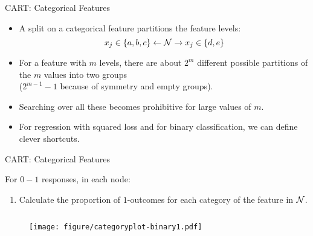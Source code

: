\documentclass[11pt,compress,t,notes=noshow, xcolor=table]{beamer}
\begin{document}
  \begin{vbframe}{CART: Categorical Features}
  \begin{itemize}
  \item A split on a categorical feature partitions the feature levels:
    $$x_j \in \{a,b,c\} \leftarrow \mathcal{N} \rightarrow x_j \in \{d,e\} $$
  \item For a feature with $m$ levels,
  there are about $2^m$ different possible partitions of the $m$ values into two groups\\ ($2^{m-1} - 1$ because of symmetry and empty groups).
  \item Searching over all these becomes prohibitive for large values of $m$.
  \item For regression with squared loss and for binary classification, we can define clever shortcuts.
  \end{itemize}

  \end{vbframe}
  
  \begin{frame}{CART: Categorical Features}

For $0-1$ responses, in each node:
  \begin{enumerate}
  \item Calculate the proportion of $1$-outcomes for each category of the feature in $\mathcal{N}$.

  \end{enumerate}
  \begin{columns}
  \begin{column}{0.33\textwidth}
  \begin{figure}
  \texttt{[image: figure/categoryplot-binary1.pdf]} 
  \end{figure}
  \end{column}
  \begin{column}{0.33\textwidth}
  \lz
  \end{column}
  \begin{column}{0.33\textwidth}
  \lz
  \end{column}
  \end{columns}

\end{frame}
\end{document}
